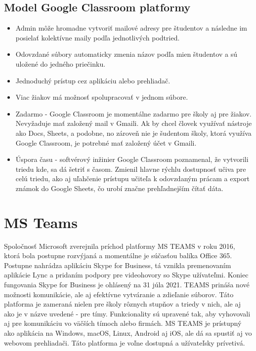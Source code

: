 \documentclass[10pt,slovak,a4paper]{article}
\begin{document}
\subsection{Model Google Classroom platformy} \label{Google Classroom: Google Classroom platforma}

\begin{itemize}
	\item Admin môže hromadne vytvoriť mailové adresy pre študentov a následne im posielať kolektívne maily podľa jednotlivých podtried. 
	\item Odovzdané súbory automaticky zmenia názov podľa mien študentov a sú uložené do jedného priečinku.
	\item Jednoduchý prístup cez aplikáciu alebo prehliadač.
	\item Viac žiakov má možnosť spolupracovať v jednom súbore.
	\item Zadarmo -
Google Classroom je momentálne zadarmo pre školy aj pre žiakov. Nevyžaduje mať založený mail v Gmaili. Ak by chcel človek využívať nástroje ako Docs, Sheets, a podobne, no zároveň nie je šudentom školy, ktorá využíva Google Classroom, je potrebné mať založený účet v Gmaili. 
	\item Úspora času - softvérový inžinier Google Classroom poznamenal, že vytvorili triedu kde, sa dá šetriť s časom. Zmienil hlavne rýchlu dostupnosť učiva pre celú triedu, ako aj uľahčenie prístupu učiteľa k odovzdaným prácam a export známok do Google Sheets, čo urobí značne prehľadnejším čítať dáta. \cite {GoogleClassroomPBL}
	\end{itemize}


\section{MS Teams} \label{MS Teams}
Spoločnosť Microsoft zverejnila príchod platformy MS TEAMS v roku 2016, ktorá bola postupne rozvýjaná a momentálne je súčasťou balíka Office 365. Postupne nahrádza aplikáciu Skype for Business, tá vznikla premenovaním aplikácie Lync a pridaním podpory pre videohovory so Skype užívateľmi. Koniec fungovania Skype for Business je ohlásený na 31 júla 2021. \cite{ohlasene_ukoncenie} TEAMS prináša nové možnosti komunikácie, ale aj efektívne vytváranie a zdieľanie súborov. Táto platforma je zameraná nielen pre školy rôznych stupňov a triedy v nich, ale aj ako je v názve uvedené - pre tímy. Funkcionality sú upravené tak, aby vyhovovali aj pre komunikáciu vo väčších tímoch alebo firmách. MS TEAMS je prístupný ako aplikácia na Windows, macOS, Linux, Android aj iOS, ale dá sa spustiť aj vo webovom prehliadači. Táto platforma je voľne dostupná a užívateľsky prívetivá. \cite {MS-TEAMS}
\end{document}
